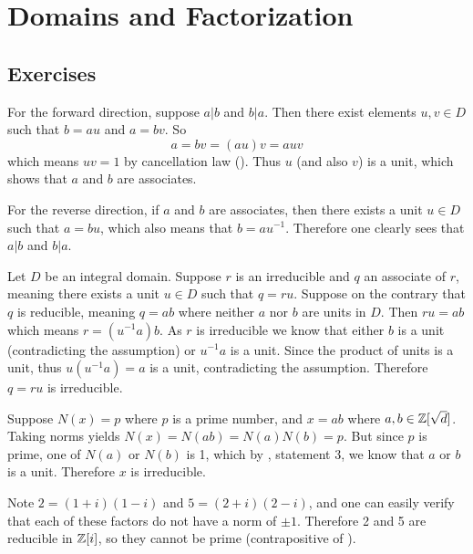 \section{Domains and Factorization}
\subsection*{Exercises}
\begin{questions}
    \item For the forward direction, suppose $a \vert b$ and $b \vert a$. Then there exist elements $u, v \in D$ such that $b = au$ and $a = bv$. So
    \[
        a = bv = (au)v = auv
    \]
    which means $uv = 1$ by cancellation law (). Thus $u$ (and also $v$) is a unit, which shows that $a$ and $b$ are associates.

    For the reverse direction, if $a$ and $b$ are associates, then there exists a unit $u \in D$ such that $a = bu$, which also means that $b = au^{-1}$. Therefore one clearly sees that $a \vert b$ and $b \vert a$.

    \item Let $D$ be an integral domain. Suppose $r$ is an irreducible and $q$ an associate of $r$, meaning there exists a unit $u \in D$ such that $q = ru$. Suppose on the contrary that $q$ is reducible, meaning $q = ab$ where neither $a$ nor $b$ are units in $D$. Then $ru = ab$ which means $r = (u^{-1}a)b$. As $r$ is irreducible we know that either $b$ is a unit (contradicting the assumption) or $u^{-1}a$ is a unit. Since the product of units is a unit, thus $u(u^{-1}a) = a$ is a unit, contradicting the assumption. Therefore $q = ru$ is irreducible.

    \item Suppose $N(x) = p$ where $p$ is a prime number, and $x = ab$ where $a,b \in \mathbb{Z}[\sqrt{d}]$. Taking norms yields $N(x) = N(ab) = N(a)N(b) = p$. But since $p$ is prime, one of $N(a)$ or $N(b)$ is 1, which by , statement 3, we know that $a$ or $b$ is a unit. Therefore $x$ is irreducible.

    \item \begin{partquestions}{\alph*}
        \item Note $2 = (1+i)(1-i)$ and $5 = (2+i)(2-i)$, and one can easily verify that each of these factors do not have a norm of $\pm1$. Therefore 2 and 5 are reducible in $\mathbb{Z}[i]$, so they cannot be prime (contrapositive of ).


\end{partquestions}
\end{questions}
